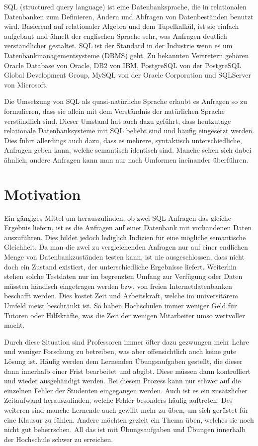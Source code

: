 
SQL (structured query language) ist eine Datenbanksprache, die in relationalen Datenbanken zum Definieren, Ändern und Abfragen von Datenbeständen benutzt wird. Basierend auf relationaler Algebra und dem Tupelkalkül, ist sie einfach aufgebaut und ähnelt der englischen Sprache sehr, was Anfragen deutlich verständlicher gestaltet. SQL ist der Standard in der Industrie wenn es um Datenbankmanagementsysteme (DBMS) geht. Zu bekannten Vertretern gehören Oracle Database von Oracle, DB2 von IBM, PostgreSQL von der PostgreSQL Global Development Group, MySQL von der Oracle Corporation und SQLServer von Microsoft.

Die Umsetzung von SQL als quasi-natürliche Sprache erlaubt es Anfragen so zu formulieren, dass sie allein mit dem Verständnis der natürlichen Sprache verständlich sind. Dieser Umstand hat auch dazu geführt, dass heutzutage relationale Datenbanksysteme mit SQL beliebt sind und häufig eingesetzt werden. 
Dies führt allerdings auch dazu, dass es mehrere, syntaktisch unterschiedliche, Anfragen geben kann, welche semantisch identisch sind. Manche sehen sich dabei ähnlich, andere Anfragen kann man nur nach Umformen ineinander überführen. 

\section{Motivation}

Ein gängiges Mittel um herauszufinden, ob zwei SQL-Anfragen das gleiche Ergebnis liefern, ist es die Anfragen auf einer Datenbank mit vorhandenen Daten auszuführen. Dies bildet jedoch lediglich Indizien für eine mögliche semantische Gleichheit. Da man die zwei zu vergleichenden Anfragen nur auf einer endlichen Menge von Datenbankzuständen testen kann, ist nie ausgeschlossen, dass nicht doch ein Zustand existiert, der unterschiedliche Ergebnisse liefert. Weiterhin stehen solche Testdaten nur im begrenzten Umfang zur Verfügung oder Daten müssten händisch eingetragen werden bzw. von freien Internetdatenbanken beschafft werden. Dies kostet Zeit und Arbeitskraft, welche im universitärem Umfeld meist beschränkt ist. So haben Hochschulen immer weniger Geld für Tutoren oder Hilfskräfte, was die Zeit der wenigen Mitarbeiter umso wertvoller macht.

Durch diese Situation sind Professoren immer öfter dazu gezwungen mehr Lehre und weniger Forschung zu betreiben, was aber offensichtlich auch keine gute Lösung ist. Häufig werden dem Lernenden Übungsaufgaben gestellt, die dieser dann innerhalb einer Frist bearbeitet und abgibt. Diese müssen dann kontrolliert und wieder ausgehändigt werden. Bei diesem Prozess kann nur schwer auf die einzelnen Fehler der Studenten eingegangen werden. Auch ist es ein zusätzlicher Zeitaufwand herauszufinden, welche Fehler besonders häufig auftreten. Des weiteren sind manche Lernende auch gewillt mehr zu üben, um sich gerüstet für eine Klausur zu fühlen. Andere möchten gezielt ein Thema üben, welches sie noch nicht gut beherrschen. All das ist mit Übungsaufgaben und Übungen innerhalb der Hochschule schwer zu erreichen. 


